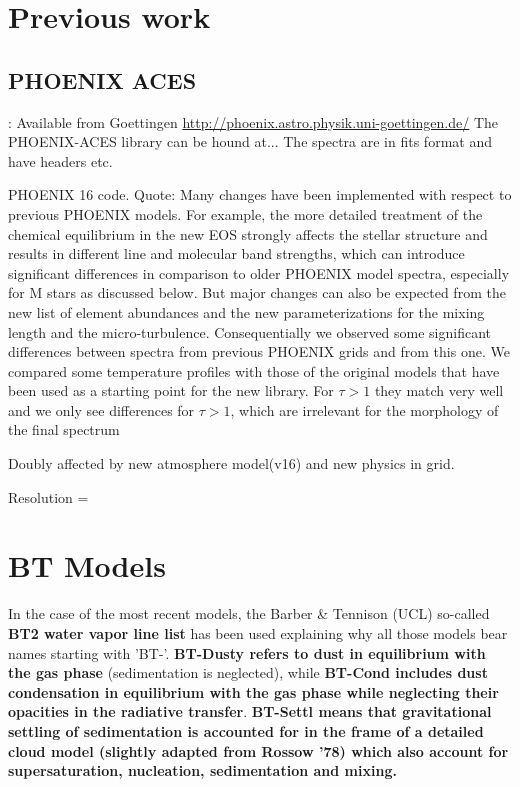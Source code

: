 \documentclass[12pt, a4paper]{article}
\begin{document}
\section{Previous work}\label{previous work}


\subsection{PHOENIX ACES}:
Available from Goettingen  \href{http://phoenix.astro.physik.uni-goettingen.de/}{http://phoenix.astro.physik.uni-goettingen.de/}
The PHOENIX-ACES library can be hound at...
The spectra are in fits format and have headers etc. 

PHOENIX 16 code.
Quote:
Many changes have been implemented with respect to previous
PHOENIX models. For example, the more detailed treatment of
the chemical equilibrium in  the  new EOS strongly affects  the
stellar structure and results in different line and molecular band
strengths, which can introduce significant differences in comparison to older PHOENIX model spectra, especially for M stars as
discussed below. But major changes can also be expected from
the new list of element abundances and the new parameterizations
for the mixing length and the micro-turbulence. Consequentially
we observed some significant differences between spectra from
previous PHOENIX grids and from this one.
We  compared some temperature profiles with those of the
original models that have been used as a starting point for the
new library. For \(\tau> 1\) they match very well and we only see
differences for \(\tau> 1\), which are irrelevant for the morphology
of the final spectrum


Doubly affected by new atmosphere model(v16) and new physics in grid. 

Resolution = 

\section{BT Models}

 In the case of the most recent models, the Barber \& Tennison (UCL) so-called \textbf{ BT2 water vapor line list} has been used explaining why all those models bear names starting with 'BT-'. \textbf{BT-Dusty refers to dust in equilibrium with the gas phase }(sedimentation is
 neglected), while \textbf{BT-Cond includes dust condensation in equilibrium with the gas phase while neglecting their opacities in the radiative transfer}. \textbf{BT-Settl means that gravitational settling of sedimentation is accounted for in the frame of a detailed cloud model (slightly adapted from Rossow '78) which also account for supersaturation, nucleation, sedimentation and mixing.}  
\end{document}
